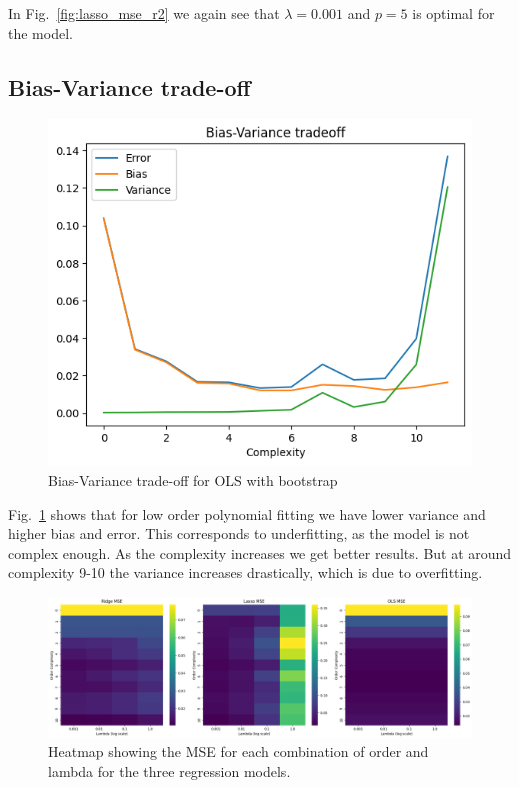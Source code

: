 \documentclass[aps,rmp,reprint,amsmath,amssymb,graphicx,longbibliography]{revtex4-1}
\begin{document}
In Fig.~\ref{fig:lasso_mse_r2} we again see that $\lambda = 0.001$ and $p = 5$ is optimal for the model.

\subsection{Bias-Variance trade-off}

\begin{figure}[H]
    \centering
    \includegraphics[width=0.9\linewidth]{Project_1/figures/Bias-Variance-Tradeoff-Bootstrap.png}
    \caption{Bias-Variance trade-off for OLS with bootstrap}
    \label{fig:bias_variance}
\end{figure}

Fig.~\ref{fig:bias_variance} shows that for low order polynomial fitting we have lower variance and higher bias and error. This corresponds to underfitting, as the model is not complex enough. As the complexity increases we get better results. But at around complexity 9-10 the variance increases drastically, which is due to overfitting.
 

\begin{figure}[H]
    \centering
    \includegraphics[width=1.0\linewidth]{Project_1/figures/Heatmap.png}
    \caption{Heatmap showing the MSE for each combination of order and lambda for the three regression models.}
    \label{fig:heatmap}
\end{figure}
\end{document}
